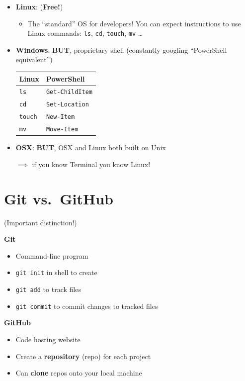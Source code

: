 \documentclass[
  letterpaper,
  DIV=11,
  numbers=noendperiod,
  oneside]{scrreprt}
\providecommand{\tightlist}{%
  \setlength{\itemsep}{0pt}\setlength{\parskip}{0pt}}\usepackage{longtable,booktabs,array}
\begin{document}
\begin{itemize}
\item
  \textbf{Linux}: (\textbf{Free!})

  \begin{itemize}
  \tightlist
  \item
    The ``standard'' OS for developers! You can expect instructions to
    use Linux commands: \texttt{ls}, \texttt{cd}, \texttt{touch},
    \texttt{mv} \ldots{}
  \end{itemize}
\item
  \textbf{Windows}: \textbf{BUT}, proprietary shell (constantly googling
  ``PowerShell equivalent'')

  \begin{longtable}[]{@{}ll@{}}
  \toprule\noalign{}
  Linux & PowerShell \\
  \midrule\noalign{}
  \endhead
  \bottomrule\noalign{}
  \endlastfoot
  \texttt{ls} & \texttt{Get-ChildItem} \\
  \texttt{cd} & \texttt{Set-Location} \\
  \texttt{touch} & \texttt{New-Item} \\
  \texttt{mv} & \texttt{Move-Item} \\
  \end{longtable}
\item
  \textbf{OSX}: \textbf{BUT}, OSX and Linux both built on Unix

  \(\implies\) if you know Terminal you know Linux!
\end{itemize}

\hypertarget{git-vs.-github-1}{%
\section{Git vs.~GitHub}\label{git-vs.-github-1}}

(Important distinction!)

\textbf{Git }

\begin{itemize}
\tightlist
\item
  Command-line program
\item
  \texttt{git\ init} in shell to create
\item
  \texttt{git\ add} to track files
\item
  \texttt{git\ commit} to commit changes to tracked files
\end{itemize}

\textbf{GitHub }

\begin{itemize}
\tightlist
\item
  Code hosting website
\item
  Create a \textbf{repository} (repo) for each project
\item
  Can \textbf{clone} repos onto your local machine
\end{itemize}
\end{document}
